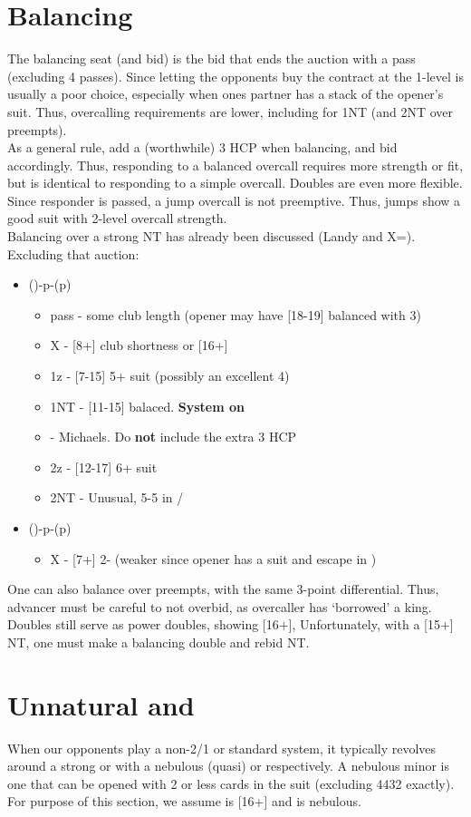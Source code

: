 \documentclass[12pt]{report}
\newcommand{\n}{\\}
\newcommand{\ul}[1]{\begin{itemize}#1\end{itemize}}
\newcommand{\li}{\item[~]}
\newcommand{\bidsection}[2]{\section{\texorpdfstring{#1}{#2}}}
\begin{document}
\section{Balancing} \label{4:7}

    The balancing seat (and bid) is the bid that ends the auction with a pass (excluding 4 passes).  Since letting the opponents buy the contract at the 1-level is usually a poor choice, especially when ones partner has a stack of the opener's suit.  Thus, overcalling requirements are lower, including for 1NT (and 2NT over preempts). \n

    As a general rule, add a (worthwhile) 3 HCP when balancing, and bid accordingly.  Thus, responding to a balanced overcall requires more strength or fit, but is identical to responding to a simple overcall.  Doubles are even more flexible. \n
    
    Since responder is passed, a jump overcall is not preemptive.  Thus, jumps show a good suit with 2-level overcall strength. \n

    Balancing over a strong NT has already been discussed (Landy and X=\cl{}).  Excluding that auction:

    \ul {
        \li ()-p-(p)
        \ul {
            \li pass - some club length (opener may have [18-19] balanced with 3\cl{})
            \li X - [8+] club shortness or [16+]
            \li 1z - [7-15] 5+ suit (possibly an excellent 4)
            \li 1NT - [11-15] balaced.  \textbf{System on}
            \li \cl2 - Michaels.  Do \textbf{not} include the extra 3 HCP
            \li 2z - [12-17] 6+ suit
            \li 2NT - Unusual, 5-5 in \di{}/\he{}
        }
        \li (\he1)-p-(p)
        \ul {
            \li X - [7+] 2-\he{} (weaker since opener has a suit and escape in \sp1)
        }
    }

    One can also balance over preempts, with the same 3-point differential. Thus, advancer must be careful to not overbid, as overcaller has `borrowed' a king. \n
    
    Doubles still serve as power doubles, showing [16+], Unfortunately, with a [15+] NT, one must make a balancing double and rebid NT.

\bidsection{Unnatural  and }{Unnatural 1♣ and 1♢}\label{4:8}

    When our opponents play a non-2/1 or standard system, it typically revolves around a strong  or  with a nebulous (quasi)  or  respectively.  A nebulous minor is one that can be opened with 2 or less cards in the suit (excluding 4432 exactly).  For purpose of this section, we assume  is [16+] and  is nebulous. \n
\end{document}
